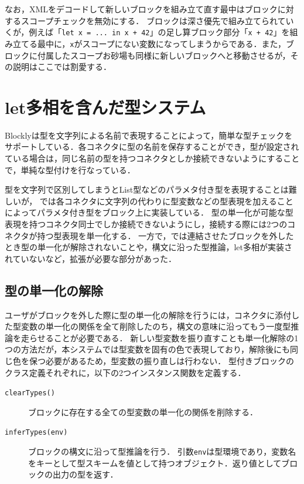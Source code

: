 なお，XMLをデコードして新しいブロックを組み立て直す最中はブロックに対するスコープチェックを無効にする．
ブロックは深さ優先で組み立てられていくが，例えば「{\tt let x = ... in x + 42}」の足し算ブロック部分「{\tt x + 42}」を組み立てる最中に，{\tt x}がスコープにない変数になってしまうからである．また，ブロックに付属したスコープお砂場も同様に新しいブロックへと移動させるが，その説明はここでは割愛する．

\section {let多相を含んだ型システム\label{katasuiron}}

Blocklyは型を文字列による名前で表現することによって，簡単な型チェックをサポートしている．各コネクタに型の名前を保存することができ，型が設定されている場合は，同じ名前の型を持つコネクタとしか接続できないようにすることで，単純な型付けを行なっている．

型を文字列で区別してしまうとList型などのパラメタ付き型を表現することは難しいが，
\cite{Typed-Blockly}では各コネクタに文字列の代わりに型変数などの型表現を加えることによってパラメタ付き型をブロック上に実装している．
型の単一化が可能な型表現を持つコネクタ同士でしか接続できないようにし，接続する際には2つのコネクタが持つ型表現を単一化する．
一方で，\cite{Typed-Blockly}では連結させたブロックを外したとき型の単一化が解除されないことや，構文に沿った型推論，let多相が実装されていないなど，拡張が必要な部分があった．

\subsection*{型の単一化の解除}
ユーザがブロックを外した際に型の単一化の解除を行うには，コネクタに添付した型変数の単一化の関係を全て削除したのち，構文の意味に沿ってもう一度型推論を走らせることが必要である．
新しい型変数を振り直すことも単一化解除の1つの方法だが，本システムでは型変数を固有の色で表現しており，解除後にも同じ色を保つ必要があるため，型変数の振り直しは行わない．
型付きブロックのクラス定義それぞれに，以下の2つインスタンス関数を定義する．
\begin{description}
 \item[{\tt clearTypes()}] ブロックに存在する全ての型変数の単一化の関係を削除する．
 \item[{\tt inferTypes(env)}] ブロックの構文に沿って型推論を行う．
引数{\tt env}は型環境であり，変数名をキーとして型スキームを値として持つオブジェクト．返り値としてブロックの出力の型を返す．
\end{description}

